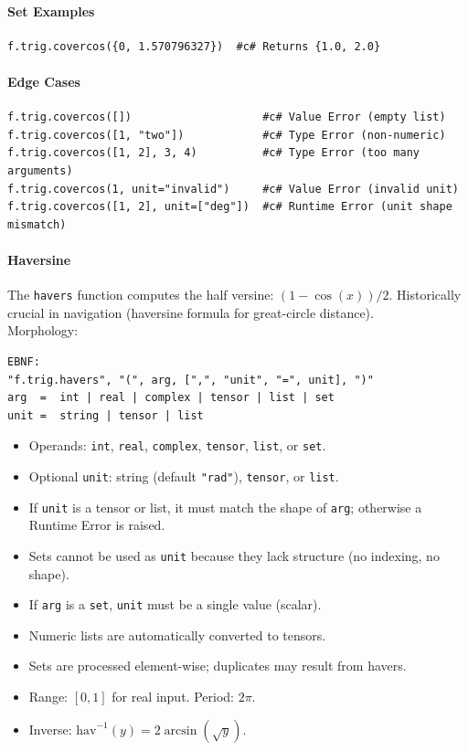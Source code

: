 \paragraph{Set Examples}
\begin{verbatim}
f.trig.covercos({0, 1.570796327})  #c# Returns {1.0, 2.0}
\end{verbatim}

\paragraph{Edge Cases}
\begin{verbatim}
f.trig.covercos([])                    #c# Value Error (empty list)
f.trig.covercos([1, "two"])            #c# Type Error (non-numeric)
f.trig.covercos([1, 2], 3, 4)          #c# Type Error (too many arguments)
f.trig.covercos(1, unit="invalid")     #c# Value Error (invalid unit)
f.trig.covercos([1, 2], unit=["deg"])  #c# Runtime Error (unit shape mismatch)
\end{verbatim}

\paragraph{Haversine}
The \texttt{havers} function computes the half versine: $(1 - \cos(x))/2$. Historically crucial in navigation (haversine formula for great-circle distance).\\
Morphology:
\begin{verbatim}
EBNF:
"f.trig.havers", "(", arg, [",", "unit", "=", unit], ")"
arg  =  int | real | complex | tensor | list | set
unit =  string | tensor | list
\end{verbatim}
\begin{itemize}
\item Operands: \texttt{int}, \texttt{real}, \texttt{complex}, \texttt{tensor}, \texttt{list}, or \texttt{set}.
\item Optional \texttt{unit}: string (default \texttt{"rad"}), \texttt{tensor}, or \texttt{list}.
\item If \texttt{unit} is a tensor or list, it must match the shape of \texttt{arg}; otherwise a Runtime Error is raised.
\item Sets cannot be used as \texttt{unit} because they lack structure (no indexing, no shape).
\item If \texttt{arg} is a \texttt{set}, \texttt{unit} must be a single value (scalar).
\item Numeric lists are automatically converted to tensors.
\item Sets are processed element-wise; duplicates may result from havers.
\item Range: $[0, 1]$ for real input. Period: $2\pi$.
\item Inverse: $\text{hav}^{-1}(y) = 2\arcsin(\sqrt{y})$.
\end{itemize}

